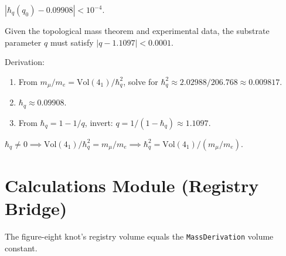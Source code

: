 \begin{lemma}
  \label{lem:hq-approx}
  $|\hbar_q(q_0) - 0.09908| < 10^{-4}$.
\end{lemma}

\begin{theorem}
  \label{thm:derive-substrate-q}
  Given the topological mass theorem and experimental data,
  the substrate parameter $q$ must satisfy $|q - 1.1097| < 0.0001$.

  Derivation:
  \begin{enumerate}
    \item From $m_\mu/m_e = \mathrm{Vol}(4_1)/\hbar_q^2$, solve for
          $\hbar_q^2 \approx 2.02988/206.768 \approx 0.009817$.
    \item $\hbar_q \approx 0.09908$.
    \item From $\hbar_q = 1 - 1/q$, invert: $q = 1/(1-\hbar_q) \approx 1.1097$.
  \end{enumerate}
\end{theorem}

\begin{lemma}
  \label{lem:mass-ratio-from-volume}
  $\hbar_q \neq 0 \implies \mathrm{Vol}(4_1)/\hbar_q^2 = m_\mu/m_e
  \implies \hbar_q^2 = \mathrm{Vol}(4_1)/(m_\mu/m_e)$.
\end{lemma}


\chapter{Calculations Module (Registry Bridge)}

\begin{theorem}
  \label{thm:registry-volume}
  \leanok
  The figure-eight knot's registry volume equals the
  \texttt{MassDerivation} volume constant.
\end{theorem}

